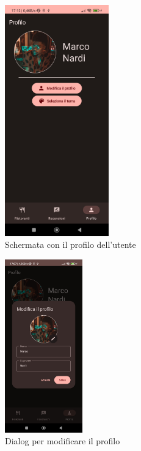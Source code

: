 \documentclass[12pt, a4paper]{report}
\begin{document}
		\begin{figure}[h]
			\centering
			\includegraphics[width=0.4\textwidth]{profileScreen.jpg} 
		  \caption{Schermata con il profilo dell'utente}
			
		\end{figure}
		\begin{figure}[h]
			\centering
			\includegraphics[width=0.3\textwidth]{editProfile.jpg} 
		  \caption{Dialog per modificare il profilo}
			
		\end{figure}
\end{document}
